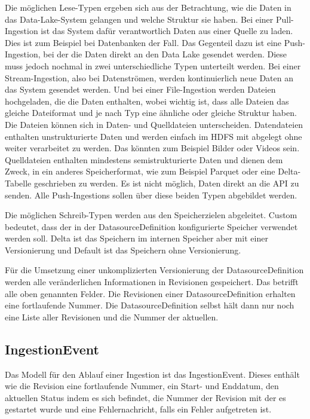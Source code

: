 Die möglichen Lese-Typen ergeben sich aus der Betrachtung, wie die Daten in das Data-Lake-System gelangen und welche Struktur sie haben.
Bei einer Pull-Ingestion ist das System dafür verantwortlich Daten aus einer Quelle zu laden.
Dies ist zum Beispiel bei Datenbanken der Fall.
Das Gegenteil dazu ist eine Push-Ingestion, bei der die Daten direkt an den Data Lake gesendet werden.
Diese muss jedoch nochmal in zwei unterschiedliche Typen unterteilt werden.
Bei einer Stream-Ingestion, also bei Datenströmen, werden kontinuierlich neue Daten an das System gesendet werden.
Und bei einer File-Ingestion werden Dateien hochgeladen, die die Daten enthalten, wobei wichtig ist, dass alle Dateien das gleiche Dateiformat und je nach Typ eine ähnliche oder gleiche Struktur haben.
Die Dateien können sich in Daten- und Quelldateien unterscheiden.
Datendateien enthalten unstrukturierte Daten und werden einfach im HDFS mit abgelegt ohne weiter verarbeitet zu werden.
Das könnten zum Beispiel Bilder oder Videos sein.
Quelldateien enthalten mindestens semistrukturierte Daten und dienen dem Zweck, in ein anderes Speicherformat, wie zum Beispiel Parquet oder eine Delta-Tabelle geschrieben zu werden.
Es ist nicht möglich, Daten direkt an die API zu senden.
Alle Push-Ingestions sollen über diese beiden Typen abgebildet werden.

Die möglichen Schreib-Typen werden aus den Speicherzielen abgeleitet.
Custom bedeutet, dass der in der DatasourceDefinition konfigurierte Speicher verwendet werden soll.
Delta ist das Speichern im internen Speicher aber mit einer Versionierung und Default ist das Speichern ohne Versionierung.

Für die Umsetzung einer unkomplizierten Versionierung der DatasourceDefinition werden alle veränderlichen Informationen in Revisionen gespeichert.
Das betrifft alle oben genannten Felder.
Die Revisionen einer DatasourceDefinition erhalten eine fortlaufende Nummer.
Die DatasourceDefinition selbst hält dann nur noch eine Liste aller Revisionen und die Nummer der aktuellen.

\subsection{IngestionEvent}

Das Modell für den Ablauf einer Ingestion ist das IngestionEvent.
Dieses enthält wie die Revision eine fortlaufende Nummer, ein Start- und Enddatum, den aktuellen Status indem es sich befindet, die Nummer der Revision mit der es gestartet wurde und eine Fehlernachricht, falls ein Fehler aufgetreten ist.

